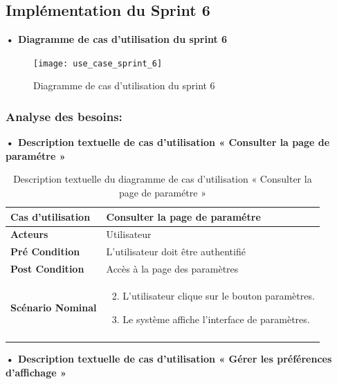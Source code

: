 \subsection{Implémentation du Sprint 6}
\textbf{•	Diagramme de cas d'utilisation du sprint 6}

\begin{figure}[H]
  \centering
  \texttt{[image: use\_case\_sprint\_6]}
  \caption{Diagramme de cas d'utilisation du sprint 6}
  \label{fig:UseCaseDiagramSp61}
\end{figure}


\subsubsection{Analyse des besoins:}

\textbf{•	Description textuelle de cas d'utilisation « Consulter la page de paramétre  »}

\begin{longtable}{|p{5cm}|p{10cm}|}
\hline
\textbf{Cas d'utilisation}&Consulter la page de paramétre\\
\hline
\textbf{Acteurs}&Utilisateur\\
\hline
\textbf{Pré Condition}&L'utilisateur doit être authentifié\\
\hline
\textbf{Post Condition}&Accès à la page des paramètres\\
\hline
\textbf{Scénario Nominal}&
\vspace{-\baselineskip}
\begin{enumerate}
  \setcounter{enumi}{1}
    \item L'utilisateur clique sur le bouton paramètres.
    \item Le système affiche l'interface de paramètres.
\end{enumerate}\\
\hline
\caption{Description textuelle du diagramme de cas d'utilisation « Consulter la page de paramétre »}
\label{tab:use_case_consult_settings_page}
\end{longtable}


\textbf{•	Description textuelle de cas d'utilisation « Gérer les préférences d'affichage   »}

